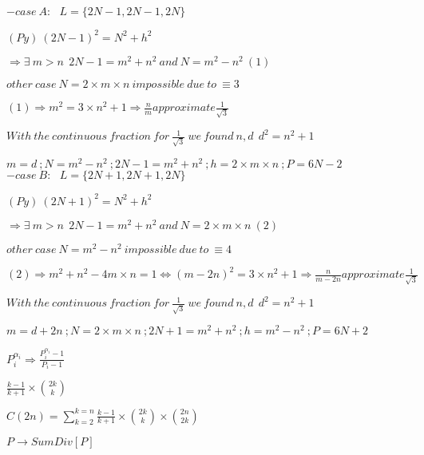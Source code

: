 \documentclass[10pt,a4paper]{letter}
\begin{document}
$ - case\ A:\ \ \ L=\{2N-1,2N-1,2N\}$

$ (Py)\  (2N-1)^{2}=N^{2}+h^{2} $

$ \Rightarrow \exists\ m>n\ \  2N-1=m^{2}+n^{2}\ and\ N=m^{2}-n^{2}\ (1) $

$ other\ case\ N=2\times m \times n\ impossible\ due\ to\ \equiv 3 $

$ (1)\Rightarrow m^{2}=3\times n^{2}+1\Rightarrow \frac{n}{m} approximate \frac{1}{\sqrt{3}}	$

$With\ the\ continuous\ fraction\ for\ \frac{1}{\sqrt{3}}\ we\ found\ n,d\ \ d^{2}=n^{2}+1 $

$m=d\ ;N=m^{2}-n^{2}\ ;2N-1=m^{2}+n^{2}
\  ;h=2\times m\times n\ ;P=6N-2  $
$ - case\ B:\ \ \ L=\{2N+1,2N+1,2N\}$

$ (Py)\  (2N+1)^{2}=N^{2}+h^{2} $

$ \Rightarrow \exists\ m>n\ \  2N-1=m^{2}+n^{2}\ and\ N=2\times m \times n\ (2) $

$ other\ case\ N=m^{2}-n^{2}\ impossible\ due\ to\ \equiv 4 $

$ (2)\Rightarrow m^{2}+n^{2}-4m\times n=1 \Leftrightarrow (m-2n)^{2}=3\times n^{2} +1\Rightarrow \frac{n}{m-2n} approximate \frac{1}{\sqrt{3}}	$

$With\ the\ continuous\ fraction\ for\ \frac{1}{\sqrt{3}}\ we\ found\ n,d\ \ d^{2}=n^{2}+1 $

$m=d+2n\ ;N=2\times m\times n\ ;2N+1=m^{2}+n^{2}
\  ;h=m^{2}-n^{2}\ ;P=6N+2  $

$ P_{i}^{\alpha_{i}}\Rightarrow\frac{P_{i}^{\alpha_{i}}-1}{P_{i}-1} $

$\frac{k-1}{k+1}\times \binom{2k}{k} $

$ C(2n) = \sum_{k=2}^{k=n} \frac{k-1}{k+1}\times \binom{2k}{k} \times \binom{2n}{2k}$ 

$ P\rightarrow SumDiv[P]$
\end{document}
